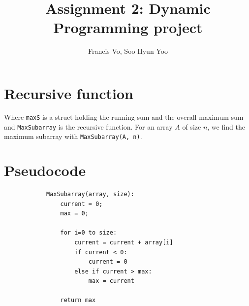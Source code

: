 \documentclass[a4paper,10pt]{article}
\title{Assignment 2: Dynamic Programming project}
\author{Francis Vo, Soo-Hyun Yoo}
\begin{document}
	\maketitle

	\section{Recursive function}
		

		\noindent Where {\tt maxS} is a struct holding the running sum and the overall maximum sum and {\tt MaxSubarray} is the recursive function. For an array $A$ of size $n$, we find the maximum subarray with {\tt MaxSubarray(A, n)}.

	\section{Pseudocode}
		\begin{verbatim}
		    MaxSubarray(array, size):
		        current = 0;
		        max = 0;

		        for i=0 to size:
		            current = current + array[i]
		            if current < 0:
		                current = 0
		            else if current > max:
		                max = current

		        return max
		\end{verbatim}
\end{document}
